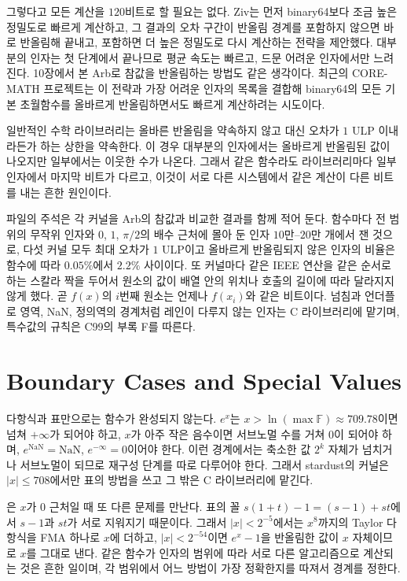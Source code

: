 그렇다고 모든 계산을 $120$비트로 할 필요는 없다. Ziv는 먼저 binary64보다 조금 높은 정밀도로 빠르게 계산하고, 그 결과의 오차 구간이 반올림 경계를 포함하지 않으면 바로 반올림해 끝내고, 포함하면 더 높은 정밀도로 다시 계산하는 전략을 제안했다\cite{ziv1991}. 대부분의 인자는 첫 단계에서 끝나므로 평균 속도는 빠르고, 드문 어려운 인자에서만 느려진다. 10장에서 본 Arb로 참값을 반올림하는 방법도 같은 생각이다. 최근의 CORE-MATH 프로젝트는 이 전략과 가장 어려운 인자의 목록을 결합해 binary64의 모든 기본 초월함수를 올바르게 반올림하면서도 빠르게 계산하려는 시도이다\cite{coremath2022}.

일반적인 수학 라이브러리는 올바른 반올림을 약속하지 않고 대신 오차가 $1$ ULP 이내라든가 하는 상한을 약속한다. 이 경우 대부분의 인자에서는 올바르게 반올림된 값이 나오지만 일부에서는 이웃한 수가 나온다. 그래서 같은 함수라도 라이브러리마다 일부 인자에서 마지막 비트가 다르고, 이것이 서로 다른 시스템에서 같은 계산이 다른 비트를 내는 흔한 원인이다.

\begin{instardust}
파일의 주석은 각 커널을 Arb의 참값과 비교한 결과를 함께 적어 둔다. 함수마다 전 범위의 무작위 인자와 $0$, $1$, $\pi/2$의 배수 근처에 몰아 둔 인자 $10$만--$20$만 개에서 잰 것으로, 다섯 커널 모두 최대 오차가 $1$ ULP이고 올바르게 반올림되지 않은 인자의 비율은 함수에 따라 $0.05\%$에서 $2.2\%$ 사이이다. 또 커널마다 같은 IEEE 연산을 같은 순서로 하는 스칼라 짝을 두어서 원소의 값이 배열 안의 위치나 호출의 길이에 따라 달라지지 않게 했다. 곧 $f(x)$의 $i$번째 원소는 언제나 $f(x_i)$와 같은 비트이다. 넘침과 언더플로 영역, NaN, 정의역의 경계처럼 레인이 다루지 않는 인자는 C 라이브러리에 맡기며, 특수값의 규칙은 C99의 부록 F를 따른다.
\end{instardust}

\section{Boundary Cases and Special Values}
\label{sec:edge-cases}

다항식과 표만으로는 함수가 완성되지 않는다. $e^x$는 $x>\ln(\max\mathbb F)\approx709.78$이면 넘쳐 $+\infty$가 되어야 하고, $x$가 아주 작은 음수이면 서브노멀 수를 거쳐 $0$이 되어야 하며, $e^{\mathrm{NaN}}=\mathrm{NaN}$, $e^{-\infty}=0$이어야 한다. 이런 경계에서는 축소한 값 $2^k$ 자체가 넘치거나 서브노멀이 되므로 재구성 단계를 따로 다루어야 한다. 그래서 stardust의  커널은 $|x|\le708$에서만 표의 방법을 쓰고 그 밖은 C 라이브러리에 맡긴다.

은 $x$가 $0$ 근처일 때 또 다른 문제를 만난다. 표의 꼴 $s(1+t)-1=(s-1)+st$에서 $s-1$과 $st$가 서로 지워지기 때문이다. 그래서 $|x|<2^{-5}$에서는 $x^8$까지의 Taylor 다항식을 FMA 하나로 $x$에 더하고, $|x|<2^{-54}$이면 $e^x-1$을 반올림한 값이 $x$ 자체이므로 $x$를 그대로 낸다. 같은 함수가 인자의 범위에 따라 서로 다른 알고리즘으로 계산되는 것은 흔한 일이며, 각 범위에서 어느 방법이 가장 정확한지를 따져서 경계를 정한다.

